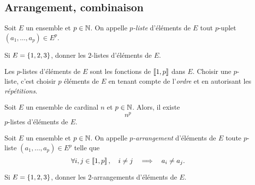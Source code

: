 \documentclass{magnolia}
\begin{document}
  
\subsection{Arrangement, combinaison}


\begin{definition}[nom={$p$-listes}]
Soit $E$ un ensemble et $p\in\mathbb{N}$. On appelle \emph{$p$-liste} d'éléments de $E$ tout
$p$-uplet $(a_1,\ldots,a_p)\in E^p$.
\end{definition}

\begin{exoUnique}
\exo Si $E=\left\{1,2,3\right\}$, donner les $2$-listes d'éléments de $E$.
\end{exoUnique}

\begin{remarques}
\remarque Les $p$-listes d'éléments de $E$ sont les fonctions de $\left\llbracket 1,p\right\rrbracket$ dans $E$.
\remarque Choisir une $p$-liste, c'est choisir $p$ éléments de $E$ en tenant
  compte de  l'\emph{ordre} et en autorisant les \emph{répétitions}.
\end{remarques}

\begin{proposition}[nom={Nombre de listes}]
Soit $E$ un ensemble de cardinal $n$ et $p\in\mathbb{N}$. Alors, il existe
\[n^p\]
$p$-listes d'éléments de $E$.
\end{proposition}


\begin{definition}[nom={$p$-arrangements}]
Soit $E$ un ensemble et $p \in \mathbb{N}$. On appelle \emph{$p$-arrangement} d'éléments de $E$
toute $p$-liste $(a_1,\dots,a_p)\in E^p$ telle que
\[\forall i,j\in\left\llbracket 1,p\right\rrbracket,\quad i\neq j\quad\Longrightarrow\quad a_i \neq a_j.\]
\end{definition}

\begin{exoUnique}
\exo Si $E=\left\{1,2,3\right\}$, donner les $2$-arrangements d'éléments de $E$.
\end{exoUnique}
\end{document}
